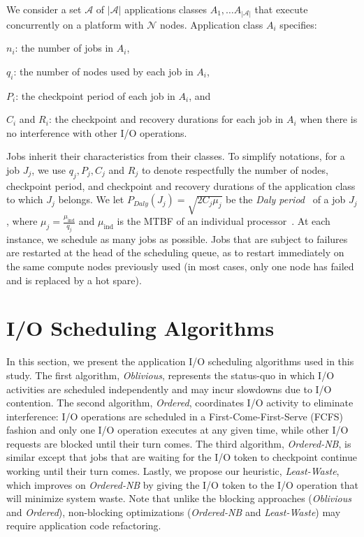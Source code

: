 \documentclass[conference,nofonttune]{IEEEtran}
\newcommand{\muind}{\mu_{\text{ind}}}
\newcommand{\appset}{{\mathcal A}}
\newcommand{\nbnodesplat}{{\mathcal N}}
\newcommand{\nbapps}{|{\mathcal A}|}
\newcommand{\app}[1]{A_{#1}}
\newcommand{\nbapp}[1]{n_{#1}}
\newcommand{\nbnodes}[1]{q_{#1}}
\newcommand{\period}[1]{P_{#1}}
\newcommand{\ckpt}[1]{C_{#1}}
\newcommand{\reco}[1]{R_{#1}}
\newcommand{\nocoop}{\emph{Oblivious}\xspace}
\newcommand{\fifoblock}{\emph{Ordered}\xspace}
\newcommand{\fifononblock}{\emph{Ordered-NB}\xspace}
\newcommand{\leastwaste}{\emph{Least-Waste}\xspace}
\def\cooperative{\leastwaste}
\begin{document}
We consider a set $\appset$ of $\nbapps$ applications classes
$\app{1}, \ldots \app{\nbapps}$ that execute concurrently on a platform with
$\nbnodesplat$ nodes. Application class $\app{i}$ specifies:
\begin{compactitem}
\item $\nbapp{i}$: the number of jobs in $\app{i}$,
\item $\nbnodes{i}$: the number of nodes used by each job in $\app{i}$,
\item $\period{i}$: the checkpoint period of each job in $\app{i}$, and
\item $\ckpt{i}$ and $\reco{i}$: the checkpoint and recovery durations for each job in $\app{i}$ when there is no interference with other I/O operations.
\end{compactitem}

Jobs inherit their characteristics from their classes. To simplify notations, 
for a job $J_j$, we use $\nbnodes{j}, \period{j}, \ckpt{j}$ and
$\reco{j}$ to denote respectfully the number of nodes, checkpoint
period, and checkpoint and recovery durations of the application class
to which $J_j$ belongs.  We let
$\period{Daly}(J_{j}) = \sqrt{2 \ckpt{j} \mu_{j}}$ be the \emph{Daly
  period}~\cite{young74,daly04} of a job $J_j$, where
$\mu_{j} = \frac{\muind}{\nbnodes{j}}$ and $\muind$ is the MTBF of an
individual processor~\cite{springer-monograph}.  At each instance, we
schedule as many jobs as possible.  Jobs that are subject to failures
are restarted at the head of the scheduling queue, as to restart
immediately on the same compute nodes previously used (in most cases,
only one node has failed and is replaced by a hot spare).



%

\section{I/O Scheduling Algorithms}
\label{sec:algorithms}

In this section, we present the application I/O scheduling algorithms used in
this study.  The first algorithm, \nocoop, represents the status-quo in which
I/O activities are scheduled independently and may incur slowdowns due to I/O
contention. The second algorithm, \fifoblock, coordinates I/O activity to
eliminate interference: I/O operations are scheduled in a
First-Come-First-Serve (FCFS) fashion and only one I/O operation executes at
any given time, while other I/O requests are blocked until their turn comes.
The third algorithm, \fifononblock, is similar except that jobs that are
waiting for the I/O token to checkpoint continue working until their turn
comes.  Lastly, we propose our heuristic, \leastwaste,  which improves on
\fifononblock by giving the I/O token to the I/O operation that will minimize
system waste. Note that unlike the blocking approaches (\nocoop and
\fifoblock), non-blocking optimizations (\fifononblock and \cooperative) may
require application code refactoring.
\end{document}
